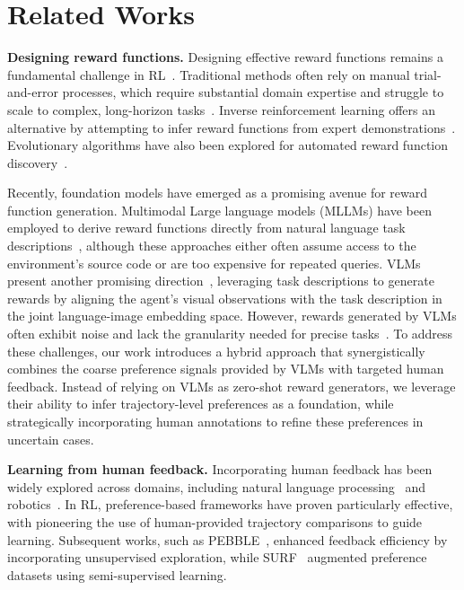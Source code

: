 \section{Related Works} \label{sec:related_works}

\noindent \textbf{Designing reward functions.} 
Designing effective reward functions remains a fundamental challenge in RL~\cite{singh2009rewards,sutton2018reinforcement}. Traditional methods often rely on manual trial-and-error processes, which require substantial domain expertise and struggle to scale to complex, long-horizon tasks~\cite{booth2023perils,knox2023reward}. Inverse reinforcement learning offers an alternative by attempting to infer reward functions from expert demonstrations~\cite{abbeel2004apprenticeship,ziebart2008maximum,ho2016generative}. Evolutionary algorithms have also been explored for automated reward function discovery~\cite{niekum2010genetic,chiang2019learning}. 

Recently, foundation models have emerged as a promising avenue for reward function generation. Multimodal Large language models (MLLMs) have been employed to derive reward functions directly from natural language task descriptions~\cite{yu2023language,ma2023eureka,wang2024}, although these approaches either often assume access to the environment's source code or are too expensive for repeated queries. VLMs present another promising direction~\cite{mahmoudieh2022zero,adeniji2023language,ma2023liv,rocamonde2023vision,sontakke2024roboclip}, leveraging task descriptions to generate rewards by aligning the agent's visual observations with the task description in the joint language-image embedding space. However, rewards generated by VLMs often exhibit noise and lack the granularity needed for precise tasks~\cite{fu2024furl}. To address these challenges, our work introduces a hybrid approach that synergistically combines the coarse preference signals provided by VLMs with targeted human feedback. Instead of relying on VLMs as zero-shot reward generators, we leverage their ability to infer trajectory-level preferences as a foundation, while strategically incorporating human annotations to refine these preferences in uncertain cases.

\noindent \textbf{Learning from human feedback.} 
Incorporating human feedback has been widely explored across domains, including natural language processing~\cite{ouyang2022training,rafailov2024direct} and robotics~\cite{lee2021pebble}. In RL, preference-based frameworks have proven particularly effective, with \citet{christiano2017deep} pioneering the use of human-provided trajectory comparisons to guide learning. Subsequent works, such as PEBBLE~\cite{lee2021pebble}, enhanced feedback efficiency by incorporating unsupervised exploration, while SURF~\cite{park2022surf} augmented preference datasets using semi-supervised learning.

